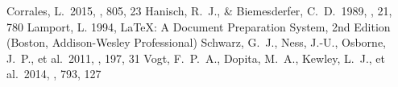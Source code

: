 \documentclass[twocolumn]{aastex6}
\newcommand\aastex{AAS\TeX}
\begin{document}



\begin{thebibliography}{}

 Corrales, L.\ 2015, \apj, 805, 23
 Hanisch, R.~J., \& Biemesderfer, C.~D.\ 1989, \baas, 21, 780 
 Lamport, L. 1994, LaTeX: A Document Preparation System, 2nd Edition (Boston, Addison-Wesley Professional)
 Schwarz, G.~J., Ness, J.-U., Osborne, J.~P., et al.\ 2011, \apjs, 197, 31  
 Vogt, F.~P.~A., Dopita, M.~A., Kewley, L.~J., et al.\ 2014, \apj, 793, 127  

\end{thebibliography}


\listofchanges
\end{document}
